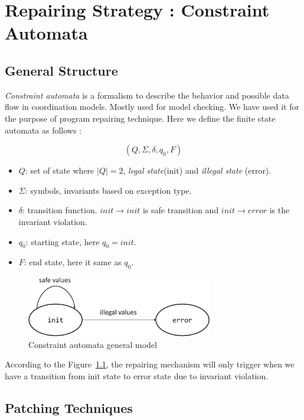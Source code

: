 \doublespacing

\chapter{Repairing Strategy : Constraint Automata}
\label{chapter:strgCA}

\section{General Structure}
\label{subsec:generalCA}

\emph{Constraint automata} is a formalism to describe the behavior and possible
data flow in coordination models.
Mostly used for model checking. We have used it for the purpose of program
repairing technique. Here we define the finite state automata as follows :

$$(Q, \Sigma, \delta, q_0, F)$$
\begin{itemize}
\item $Q$: set of state where $|Q| = 2$, \emph{legal state}(init) and
\emph{illegal state} (error).
\item $\Sigma$: symbols, invariants based on exception type.
\item $\delta$: transition function. $init \rightarrow init$ is safe transition
and $init \rightarrow error$ is the invariant violation.
\item $q_0$: starting state, here $q_0 = init$.
\item $F$: end state, here it same as $q_0$.
\end{itemize}

\begin{figure}[!htb]
\centering
\includegraphics[width=3.2in]{images/automata.eps}
\caption{Constraint automata general model}
\label{fig:automata}
\end{figure}

According to the Figure~\ref{fig:automata}, the repairing mechanism will only
trigger when we have a transition from init state to error state due to
invariant violation.

\section{Patching Techniques}
\label{subsec:patchCA}

